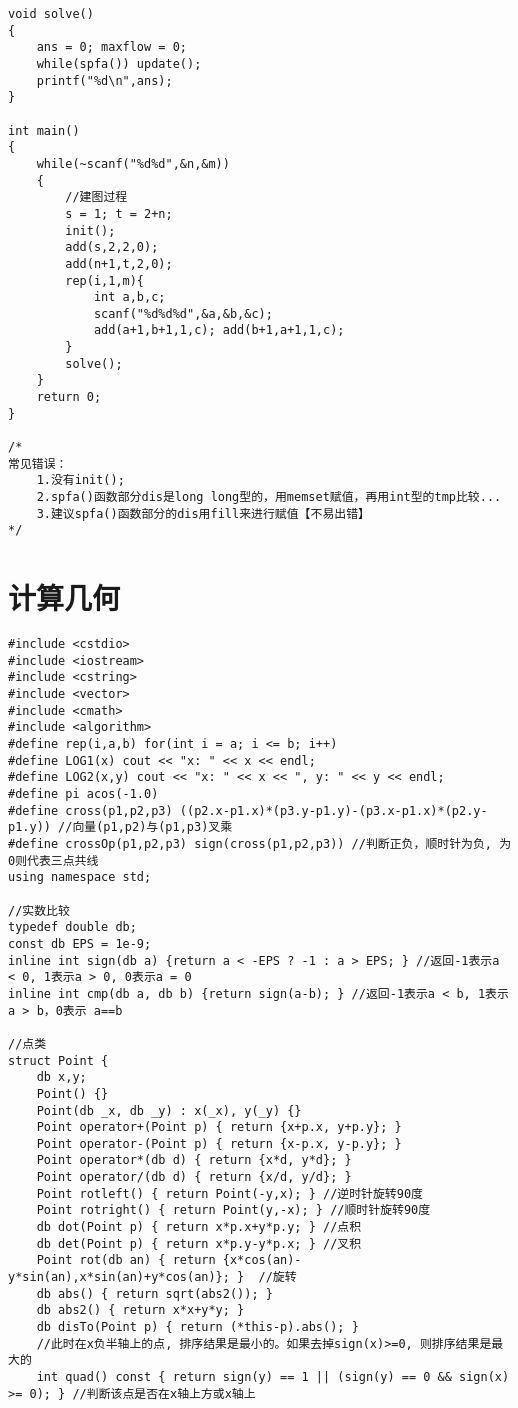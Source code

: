 \documentclass[twoside]{article}
\begin{document}
\begin{lstlisting}
void solve()
{
	ans = 0; maxflow = 0;
	while(spfa()) update();
	printf("%d\n",ans);
}

int main()
{
	while(~scanf("%d%d",&n,&m))
	{
		//建图过程
		s = 1; t = 2+n;
		init();
		add(s,2,2,0);
		add(n+1,t,2,0);
		rep(i,1,m){
			int a,b,c;
			scanf("%d%d%d",&a,&b,&c);
			add(a+1,b+1,1,c); add(b+1,a+1,1,c);
		}
		solve();
	}
	return 0;
}

/*
常见错误：
	1.没有init();
	2.spfa()函数部分dis是long long型的，用memset赋值，再用int型的tmp比较...
	3.建议spfa()函数部分的dis用fill来进行赋值【不易出错】
*/\end{lstlisting}
\clearpage\section{计算几何}
\begin{lstlisting}
#include <cstdio>
#include <iostream>
#include <cstring>
#include <vector>
#include <cmath>
#include <algorithm>
#define rep(i,a,b) for(int i = a; i <= b; i++)
#define LOG1(x) cout << "x: " << x << endl;
#define LOG2(x,y) cout << "x: " << x << ", y: " << y << endl;
#define pi acos(-1.0)
#define cross(p1,p2,p3) ((p2.x-p1.x)*(p3.y-p1.y)-(p3.x-p1.x)*(p2.y-p1.y)) //向量(p1,p2)与(p1,p3)叉乘
#define crossOp(p1,p2,p3) sign(cross(p1,p2,p3))	//判断正负，顺时针为负, 为0则代表三点共线
using namespace std;

//实数比较
typedef double db;
const db EPS = 1e-9;
inline int sign(db a) {return a < -EPS ? -1 : a > EPS; } //返回-1表示a < 0, 1表示a > 0, 0表示a = 0
inline int cmp(db a, db b) {return sign(a-b); } //返回-1表示a < b, 1表示a > b，0表示 a==b

//点类
struct Point {
	db x,y;
	Point() {}
	Point(db _x, db _y) : x(_x), y(_y) {}
	Point operator+(Point p) { return {x+p.x, y+p.y}; }
	Point operator-(Point p) { return {x-p.x, y-p.y}; }
	Point operator*(db d) { return {x*d, y*d}; }
	Point operator/(db d) { return {x/d, y/d}; }
	Point rotleft() { return Point(-y,x); } //逆时针旋转90度
	Point rotright() { return Point(y,-x); } //顺时针旋转90度
	db dot(Point p) { return x*p.x+y*p.y; }	//点积
	db det(Point p) { return x*p.y-y*p.x; } //叉积
	Point rot(db an) { return {x*cos(an)-y*sin(an),x*sin(an)+y*cos(an)}; }	//旋转
	db abs() { return sqrt(abs2()); }
	db abs2() { return x*x+y*y; }
	db disTo(Point p) { return (*this-p).abs(); }
	//此时在x负半轴上的点, 排序结果是最小的。如果去掉sign(x)>=0, 则排序结果是最大的
	int quad() const { return sign(y) == 1 || (sign(y) == 0 && sign(x) >= 0); } //判断该点是否在x轴上方或x轴上


\end{lstlisting}
\end{document}

